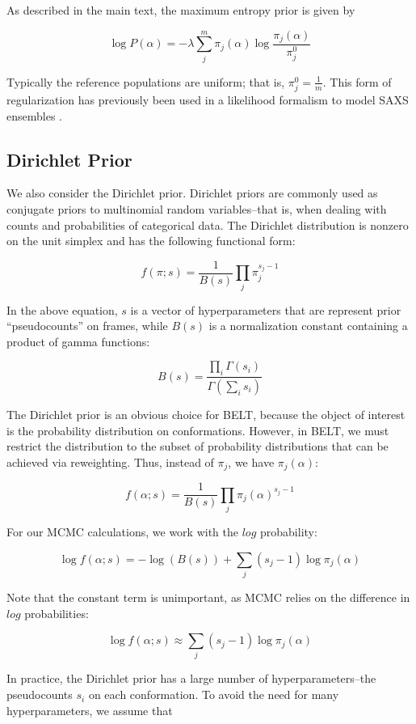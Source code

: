 \documentclass[12pt]{article}
\begin{document}
As described in the main text, the maximum entropy prior is given by 

$$\log P(\alpha) = -\lambda \sum_j^m \pi_j(\alpha) \log \frac{\pi_j(\alpha)}{\pi_j^0}$$

Typically the reference populations are uniform; that is, $\pi_j^0 = \frac{1}{m}$.  This form of regularization has previously been used in a likelihood formalism to model SAXS ensembles \cite{rozycki2011saxs}.  

\subsection*{Dirichlet Prior}

We also consider the Dirichlet prior.  Dirichlet priors are commonly used as conjugate priors to multinomial random variables--that is, when dealing with counts and probabilities of categorical data.  The Dirichlet distribution is nonzero on the unit simplex and has the following functional form:

$$f(\pi;s) = \frac{1}{B(s)} \prod_j \pi_j^{s_j - 1}$$

In the above equation, $s$ is a vector of hyperparameters that are represent prior ``pseudocounts'' on frames, while $B(s)$ is a normalization constant containing a product of gamma functions:

$$B(s) = \frac{\prod_i \Gamma(s_i)}{\Gamma(\sum_i s_i)}$$

The Dirichlet prior is an obvious choice for BELT, because the object of interest is the probability distribution on conformations.  However, in BELT, we must restrict the distribution to the subset of probability distributions that can be achieved via reweighting.  Thus, instead of $\pi_j$, we have $\pi_j(\alpha)$:

$$f(\alpha;s) = \frac{1}{B(s)} \prod_j \pi_j(\alpha)^{s_j - 1}$$

For our MCMC calculations, we work with the $log$ probability:

$$\log f(\alpha;s) = -\log(B(s)) + \sum_j (s_j - 1) \log \pi_j(\alpha)$$

Note that the constant term is unimportant, as MCMC relies on the difference in $log$ probabilities:

$$\log f(\alpha;s) \approx \sum_j (s_j - 1) \log \pi_j(\alpha)$$

In practice, the Dirichlet prior has a large number of hyperparameters--the pseudocounts $s_i$ on each conformation.  To avoid the need for many hyperparameters, we assume that 
\end{document}
